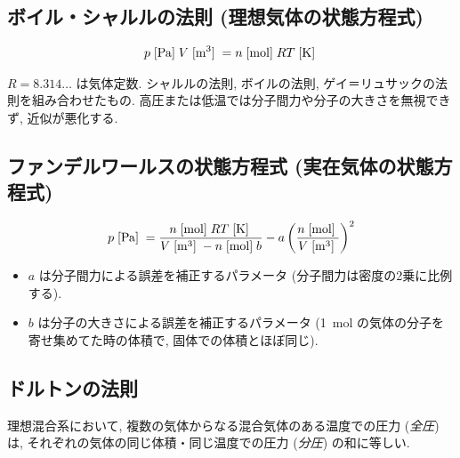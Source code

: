 \documentclass[a4paper,11pt]{jsarticle}
\newcommand{\braunit}[1]{\;\text{[}\unit[per-mode = symbol]{#1}\text{]}\;}
\begin{document}
\subsection{ボイル・シャルルの法則 (理想気体の状態方程式)}
\begin{align*}
  p\braunit{\Pa}V\braunit{\m^3} = n\braunit{\mol}RT\braunit{\K}
\end{align*}
\par $R=8.314\dots$ は気体定数. シャルルの法則, ボイルの法則, ゲイ＝リュサックの法則を組み合わせたもの. 高圧または低温では分子間力や分子の大きさを無視できず, 近似が悪化する.
\cite[pp.15]{thermo}

\subsection{ファンデルワールスの状態方程式 (実在気体の状態方程式)}
\begin{align*}
  p\braunit{\Pa} = \frac{n\braunit{\mol}RT\braunit{\K}}{V\braunit{\m^3} - n\braunit{\mol}b} - a\left(\frac{n\braunit{\mol}}{V\braunit{\m^3}}\right)^2
\end{align*}
\begin{itemize}
  \item $a$ は分子間力による誤差を補正するパラメータ (分子間力は密度の2乗に比例する).
  \item $b$ は分子の大きさによる誤差を補正するパラメータ (\qty{1}{\mol} の気体の分子を寄せ集めてた時の体積で, 固体での体積とほぼ同じ).
\end{itemize}
\par \cite[pp.17]{thermo}

\subsection{ドルトンの法則}
理想混合系において, 複数の気体からなる混合気体のある温度での圧力 (\emph{全圧}) は,
それぞれの気体の同じ体積・同じ温度での圧力 (\emph{分圧}) の和に等しい.
\cite[pp.18]{thermo}
\end{document}
